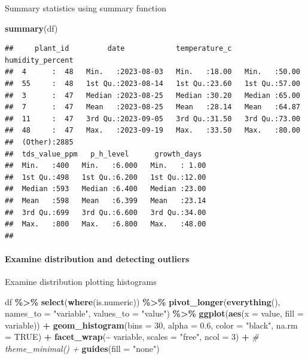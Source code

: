 \documentclass[
]{article}
\newenvironment{Shaded}{\begin{snugshade}}{\end{snugshade}}
\newcommand{\AttributeTok}[1]{\textcolor[rgb]{0.13,0.29,0.53}{#1}}
\newcommand{\CommentTok}[1]{\textcolor[rgb]{0.56,0.35,0.01}{\textit{#1}}}
\newcommand{\ConstantTok}[1]{\textcolor[rgb]{0.56,0.35,0.01}{#1}}
\newcommand{\DecValTok}[1]{\textcolor[rgb]{0.00,0.00,0.81}{#1}}
\newcommand{\FloatTok}[1]{\textcolor[rgb]{0.00,0.00,0.81}{#1}}
\newcommand{\FunctionTok}[1]{\textcolor[rgb]{0.13,0.29,0.53}{\textbf{#1}}}
\newcommand{\NormalTok}[1]{#1}
\newcommand{\SpecialCharTok}[1]{\textcolor[rgb]{0.81,0.36,0.00}{\textbf{#1}}}
\newcommand{\StringTok}[1]{\textcolor[rgb]{0.31,0.60,0.02}{#1}}
\begin{document}
Summary statistics using summary function

\begin{Shaded}
\begin{Highlighting}[]
\FunctionTok{summary}\NormalTok{(df)}
\end{Highlighting}
\end{Shaded}

\begin{verbatim}
##     plant_id         date            temperature_c   humidity_percent
##  4      :  48   Min.   :2023-08-03   Min.   :18.00   Min.   :50.00   
##  55     :  48   1st Qu.:2023-08-14   1st Qu.:23.60   1st Qu.:57.00   
##  3      :  47   Median :2023-08-25   Median :30.20   Median :65.00   
##  7      :  47   Mean   :2023-08-25   Mean   :28.14   Mean   :64.87   
##  11     :  47   3rd Qu.:2023-09-05   3rd Qu.:31.50   3rd Qu.:73.00   
##  48     :  47   Max.   :2023-09-19   Max.   :33.50   Max.   :80.00   
##  (Other):2885                                                        
##  tds_value_ppm   p_h_level      growth_days   
##  Min.   :400   Min.   :6.000   Min.   : 1.00  
##  1st Qu.:498   1st Qu.:6.200   1st Qu.:12.00  
##  Median :593   Median :6.400   Median :23.00  
##  Mean   :598   Mean   :6.399   Mean   :23.14  
##  3rd Qu.:699   3rd Qu.:6.600   3rd Qu.:34.00  
##  Max.   :800   Max.   :6.800   Max.   :48.00  
## 
\end{verbatim}

\paragraph{Examine distribution and detecting
outliers}\label{examine-distribution-and-detecting-outliers}

Examine distribution plotting histograms

\begin{Shaded}
\begin{Highlighting}[]
\NormalTok{df }\SpecialCharTok{\%\textgreater{}\%} \FunctionTok{select}\NormalTok{(}\FunctionTok{where}\NormalTok{(is.numeric)) }\SpecialCharTok{\%\textgreater{}\%} 
  \FunctionTok{pivot\_longer}\NormalTok{(}\FunctionTok{everything}\NormalTok{(),}
               \AttributeTok{names\_to =} \StringTok{"variable"}\NormalTok{,}
               \AttributeTok{values\_to =} \StringTok{"value"}\NormalTok{) }\SpecialCharTok{\%\textgreater{}\%} 
  \FunctionTok{ggplot}\NormalTok{(}\FunctionTok{aes}\NormalTok{(}\AttributeTok{x =}\NormalTok{ value, }\AttributeTok{fill =}\NormalTok{ variable)) }\SpecialCharTok{+}
  \FunctionTok{geom\_histogram}\NormalTok{(}\AttributeTok{bins =} \DecValTok{30}\NormalTok{, }\AttributeTok{alpha =} \FloatTok{0.6}\NormalTok{, }\AttributeTok{color =} \StringTok{"black"}\NormalTok{, }\AttributeTok{na.rm =} \ConstantTok{TRUE}\NormalTok{) }\SpecialCharTok{+}
  \FunctionTok{facet\_wrap}\NormalTok{(}\SpecialCharTok{\textasciitilde{}}\NormalTok{ variable, }\AttributeTok{scales =} \StringTok{"free"}\NormalTok{, }\AttributeTok{ncol =} \DecValTok{3}\NormalTok{) }\SpecialCharTok{+}
\CommentTok{\# theme\_minimal() + }
  \FunctionTok{guides}\NormalTok{(}\AttributeTok{fill =} \StringTok{"none"}\NormalTok{)}
\end{Highlighting}
\end{Shaded}
\end{document}
